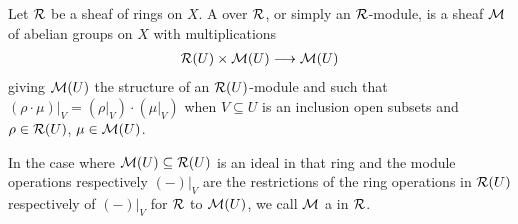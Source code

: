 \documentclass[a4paper,parskip=half,numbers=enddot, DIV=12]{scrreprt}
\begin{document}
\begin{defi}
    Let $\mathcal{R}$ be a sheaf of rings on $X$. A  over $\mathcal{R}$, or simply an $\mathcal{R}$-module, is a sheaf $\mathcal{M}$ of abelian groups on $X$ with multiplications
    \begin{align*}
        \Rr(U)\times \Mm(U) \morphism \Mm(U)
    \end{align*}
    giving $\mathcal{M}(U)$ the structure of an $\mathcal{R}(U)$-module and such that $(\rho\cdot \mu)|_V = (\rho|_V)\cdot (\mu|_V)$ when $V\subseteq U$ is an inclusion open subsets and $\rho\in\mathcal{R}(U)$, $\mu\in\mathcal{M}(U)$. 
    
    In the case where $\mathcal{M}(U) \subseteq \mathcal{R}(U)$ is an ideal in that ring and the module operations respectively $(-)|_V$ are the restrictions of the ring operations in $\mathcal{R}(U)$ respectively of $(-)|_V$ for $\mathcal{R}$ to $\mathcal{M}(U)$, we call $\mathcal{M}$ a  in $\mathcal{R}$.
\end{defi}
\end{document}
